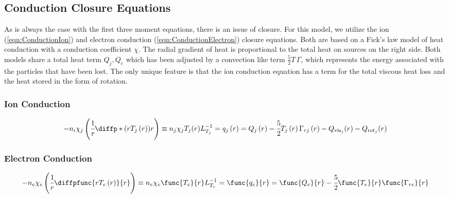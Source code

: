 \subsection{Conduction Closure Equations} \label{sub:ConductionClosure}
As is always the case with the first three moment equations, there is an issue of closure. For this model, we utilize the ion (\cref{eqn:ConductionIon}) and electron conduction (\cref{eqn:ConductionElectron}) closure equations. Both are based on a Fick's law model of heat conduction with a conduction coefficient $\chi$. The radial gradient of heat is proportional to the total heat on sources on the right side. Both models share a total heat term $Q_j, Q_e$ which has been adjusted by a convection like term $\frac{5}{2}T\,\Gamma$, which represents the energy associated with the particles that have been lost. The only unique feature is that the ion conduction equation has a term for the total viscous heat loss and the heat stored in the form of rotation.


\subsubsection{Ion Conduction} \label{subsub:ConductionClosureIon}

\begin{multline} \label{eqn:ConductionIon}
	-n_i \chi_j \left( \cfrac{1}{r} \diffp*{\left( \vphantom{\diffp*{}r}r T_j\left( r \right) \right)}r \right) \equiv	n_j \chi_j T_j(r) L^{-1}_{T_j} = 	q_j\left( r \right) = Q_j \left( r \right) - \cfrac{5}{2} T_j \left( r \right) \Gamma_{rj} \left( r \right) - Q_{\mathrm{vis}_j}(r) - Q_{\mathrm{rot}_j}(r)
\end{multline}

\subsubsection{Electron Conduction} \label{subsub:ConductionClosureElectron}

\begin{equation} \label{eqn:ConductionElectron}
	-n_e \chi_e \left( \cfrac{1}{r} \diffpfunc{r T_e\left( r \right) }{r} \right) \equiv
	n_e \chi_e \func{T_e}{r} L^{-1}_{T_e} = 
	\func{q_e}{r} = \func{Q_e}{r} - \cfrac{5}{2} \func{T_e}{r} \func{\Gamma_{re}}{r}
\end{equation}
